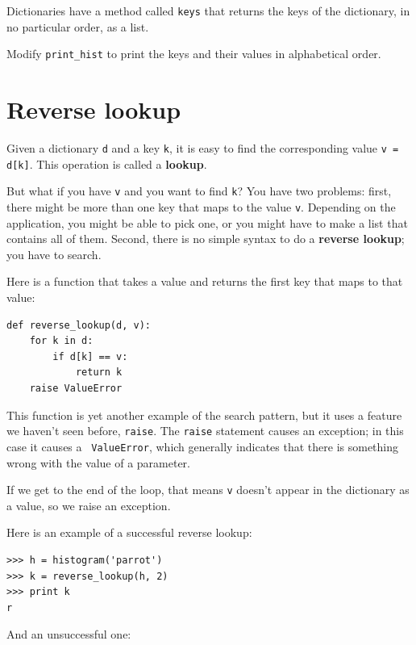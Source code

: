 \documentclass[10pt]{book}
\begin{document}
\begin{exercise}

Dictionaries have a method called {\tt keys} that returns
the keys of the dictionary, in no particular order, as a list.

Modify \verb"print_hist" to print the keys and their values
in alphabetical order.
\end{exercise}



\section{Reverse lookup}
\label{raise}

Given a dictionary {\tt d} and a key {\tt k}, it is easy to
find the corresponding value {\tt v = d[k]}.  This operation
is called a {\bf lookup}.

But what if you have {\tt v} and you want to find {\tt k}?
You have two problems: first, there might be more than one
key that maps to the value {\tt v}.  Depending on the application,
you might be able to pick one, or you might have to make
a list that contains all of them.  Second, there is no
simple syntax to do a {\bf reverse lookup}; you have to search.

Here is a function that takes a value and returns the first
key that maps to that value:

\begin{verbatim}
def reverse_lookup(d, v):
    for k in d:
        if d[k] == v:
            return k
    raise ValueError
\end{verbatim}
%
This function is yet another example of the search pattern, but it
uses a feature we haven't seen before, {\tt raise}.  The {\tt raise}
statement causes an exception; in this case it causes a {\tt
  ValueError}, which generally indicates that there is something wrong
with the value of a parameter.

If we get to the end of the loop, that means {\tt v}
doesn't appear in the dictionary as a value, so we raise an
exception.

Here is an example of a successful reverse lookup:

\begin{verbatim}
>>> h = histogram('parrot')
>>> k = reverse_lookup(h, 2)
>>> print k
r
\end{verbatim}
%
And an unsuccessful one:
\end{document}
